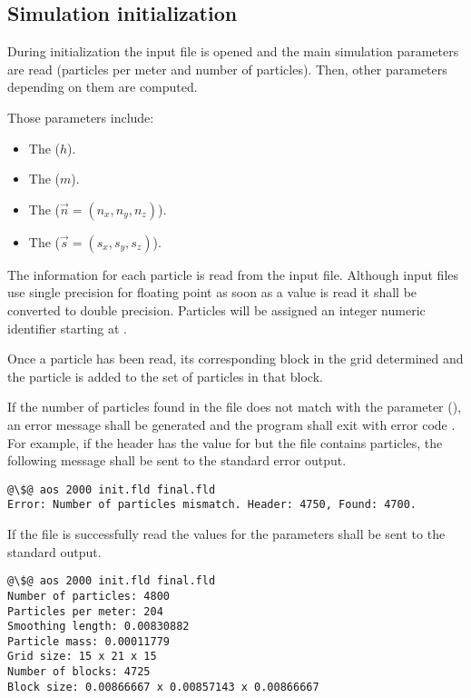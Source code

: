 \subsection{Simulation initialization}

During initialization the input file is opened and the main simulation
parameters are read (particles per meter and number of particles).
Then, other parameters depending on them are computed.

Those parameters include:
\begin{itemize}
\item The  ($h$).
\item The  ($m$).
\item The  ($\vec{n} = (n_x, n_y, n_z)$).
\item The  ($\vec{s} = (s_x, s_y, s_z)$).
\end{itemize}

The information for each particle is read from the input file. Although input
files use single precision for floating point as soon as a value is read it
shall be converted to double precision.  Particles will be assigned an integer
numeric identifier starting at .

Once a particle has been read, its corresponding block in the grid determined
and the particle is added to the set of particles in that block. 

If the number of particles found in the file does not match with the parameter
 (), an error message shall be generated
and the program shall exit with error code . For example, if the 
header has the value  for  but the file contains 
 particles, the following message shall be sent to the standard
error output.

\begin{lstlisting}[style=terminal,escapechar=@]
@\$@ aos 2000 init.fld final.fld
Error: Number of particles mismatch. Header: 4750, Found: 4700.
\end{lstlisting}

If the file is successfully read the values for the parameters shall be sent
to the standard output.

\begin{lstlisting}[style=terminal,escapechar=@]
@\$@ aos 2000 init.fld final.fld
Number of particles: 4800
Particles per meter: 204
Smoothing length: 0.00830882
Particle mass: 0.00011779
Grid size: 15 x 21 x 15
Number of blocks: 4725
Block size: 0.00866667 x 0.00857143 x 0.00866667
\end{lstlisting}

